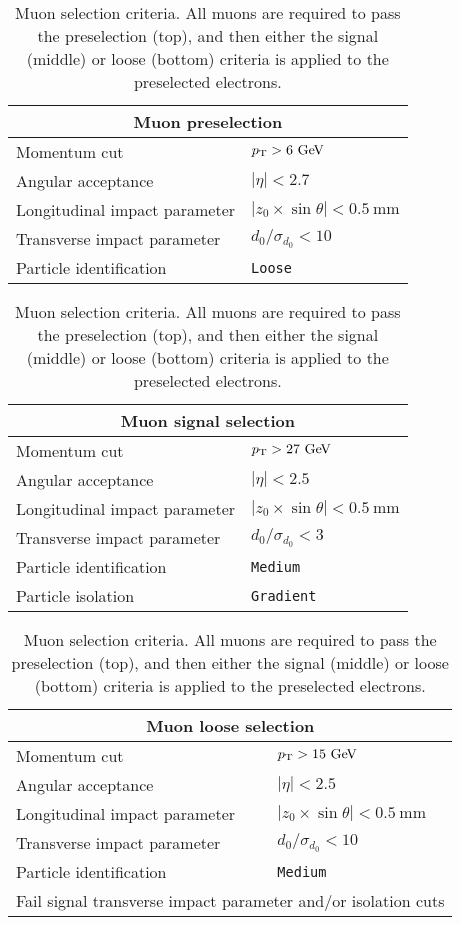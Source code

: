 \begin{table}[htbp]
  \centering
  \begin{tabular}{l l}
    \multicolumn{2}{c}{Muon preselection} \\ 
    \hline\hline
    Momentum cut                  & $\pt > 6\gev$ \\
    Angular acceptance            & $|\eta| < 2.7$ \\
    Longitudinal impact parameter & $|z_0\times\sin\theta| < 0.5~\textrm{mm}$ \\
    Transverse impact parameter   & $d_0/\sigma_{d_{0}} < 10$ \\
    Particle identification       & \tt{Loose} \\
    \hline
  \end{tabular}

  \vspace{8mm}

  \begin{tabular}{l l}
    \multicolumn{2}{c}{Muon signal selection} \\ 
    \hline\hline
    Momentum cut                  & $\pt > 27\gev$ \\
    Angular acceptance            & $|\eta| < 2.5$ \\
    Longitudinal impact parameter & $|z_0\times\sin\theta| < 0.5~\textrm{mm}$ \\
    Transverse impact parameter   & $d_0/\sigma_{d_{0}} < 3$ \\
    Particle identification       & \tt{Medium} \\
    Particle isolation            & \tt{Gradient}\\
    \hline
  \end{tabular}

  \vspace{8mm}

  \begin{tabular}{l l}
    \multicolumn{2}{c}{Muon loose selection} \\ 
    \hline\hline
    Momentum cut                  & $\pt > 15\gev$ \\
    Angular acceptance            & $|\eta| < 2.5$ \\
    Longitudinal impact parameter & $|z_0\times\sin\theta| < 0.5~\textrm{mm}$ \\
    Transverse impact parameter   & $d_0/\sigma_{d_{0}} < 10$ \\
    Particle identification       & \tt{Medium} \\
    \multicolumn{2}{c}{Fail signal transverse impact parameter and/or isolation cuts} \\
    \hline
  \end{tabular}
  \caption{Muon selection criteria.  All muons are required to pass the preselection (top), and then either the signal (middle) or loose (bottom) criteria is applied to the preselected electrons.}
  \label{tab:ssww13tev_muon_selection}
\end{table}
